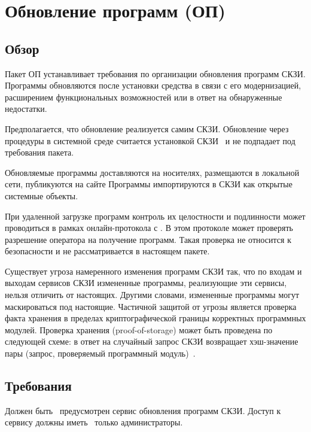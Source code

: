 \section{Обновление программ (ОП)}\label{SU}

\subsection{Обзор}\label{SU.Intro}

Пакет ОП устанавливает требования по организации обновления программ СКЗИ.
Программы обновляются после установки средства в связи с его модернизацией, 
расширением функциональных возможностей или в ответ на обнаруженные недостатки.

Предполагается, что обновление реализуется самим СКЗИ. Обновление через 
процедуры в системной среде считается установкой СКЗИ~ 
и не подпадает под требования пакета.

Обновляемые программы доставляются на  носителях,
размещаются в локальной сети, публикуются на сайте 
%
Программы импортируются в СКЗИ как открытые системные объекты.

При удаленной загрузке программ контроль их целостности и подлинности 
может проводиться в рамках онлайн-протокола с . 
В этом протоколе  может проверять разрешение оператора на 
получение программ. Такая проверка не относится к безопасности и не 
рассматривается в настоящем пакете.

Существует угроза намеренного изменения программ СКЗИ так, что по
входам и выходам сервисов СКЗИ измененные программы, реализующие эти сервисы, 
нельзя отличить от настоящих. Другими словами, измененные программы могут 
маскироваться под настоящие. Частичной защитой от угрозы является проверка 
факта хранения в пределах криптографической границы корректных программных 
модулей. Проверка хранения (proof-of-storage) может быть проведена по следующей 
схеме: в ответ на случайный запрос СКЗИ возвращает хэш-значение пары (запрос, 
проверяемый программный модуль)~.

\subsection{Требования}\label{SU.Reqs}

\label{R.SU.Service}
Должен быть~ предусмотрен сервис обновления 
программ СКЗИ. Доступ к сервису должны иметь~ 
только администраторы.

